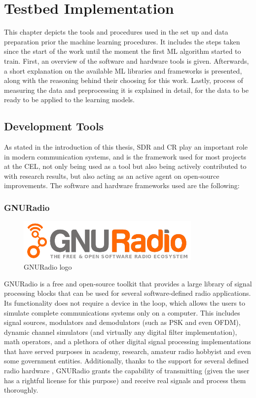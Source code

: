 \acresetall
\chapter{Testbed Implementation}\label{chapter:implementation}\label{ch:implementation}
This chapter depicts the tools and procedures used in the set up and data preparation prior the machine learning procedures. It includes the steps taken since the start of the work until the moment the first \ac{ML} algorithm started to train. First, an overview of the software and hardware tools is given. Afterwards, a short explanation on the available \ac{ML} libraries and frameworks is presented, along with the reasoning behind their choosing for this work. Lastly, process of measuring the data and preprocessing it is explained in detail, for the data to be ready to be applied to the learning models.
\section{Development Tools}\label{ch:tools}
As stated in the introduction of this thesis, \ac{SDR} and \ac{CR} play an important role in modern communication systems, and is the framework used for most projects at the \ac{CEL}, not only being used as a tool but also being actively contributed to with research results, but also acting as an active agent on open-source improvements. The software and hardware frameworks used are the following:
\subsection{GNURadio}
\begin{figure}[htb]
    \centering
      \includegraphics[width=0.8\textwidth]{figures/gnuradio_logo}
      \caption{GNURadio logo}
      \label{fig:gnuradio}
\end{figure}
GNURadio \cite{GNURadio2016} is a free and open-source toolkit that provides a large library of signal processing blocks that can be used for several software-defined radio applications. Its functionality does not require a device in the loop, which allows the users to simulate complete communications systems only on a computer. This includes signal sources, modulators and demodulators (such as \ac{PSK} and even \ac{OFDM}), dynamic channel simulators (and virtually any digital filter implementation), math operators, and a plethora of other digital signal processing implementations that have served purposes in academy, research, amateur radio hobbyist and even some government entities. Additionally, thanks to the support for several defined radio hardware \cite{gnuradiohw}, GNURadio grants the capability of transmitting (given the user has a rightful license for this purpose) and receive real signals and process them thoroughly.\\

